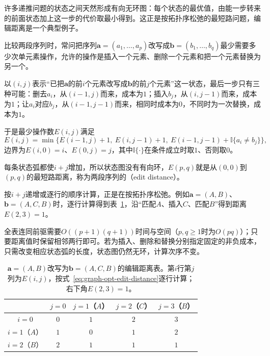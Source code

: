 许多递推问题的状态之间天然形成有向无环图：每个状态的最优值，由能一步转来的前面状态加上这一步的代价取最小得到。这正是按拓扑序松弛的最短路问题，编辑距离是一个典型例子。

比较两段序列时，常问把序列$\bm a=(a_1,\ldots,a_p)$改写成$\bm b=(b_1,\ldots,b_q)$最少需要多少次单元素操作，允许的操作是插入一个元素、删除一个元素和把一个元素替换为另一个。

以$(i,j)$表示“已把$\bm a$的前$i$个元素改写成$\bm b$的前$j$个元素”这一状态，最后一步只有三种可能：删去$a_i$，从$(i-1,j)$而来，成本为$1$；插入$b_j$，从$(i,j-1)$而来，成本为$1$；让$a_i$对应$b_j$，从$(i-1,j-1)$而来，相同时成本为$0$，不同时为一次替换，成本为$1$。

于是最少操作数$E(i,j)$满足
\begin{equation}
  E(i,j)=\min\bigl\{E(i-1,j)+1,\ E(i,j-1)+1,\ E(i-1,j-1)+\mathbb I\{a_i\neq b_j\}\bigr\},
  \label{eq:graph-opt-edit-distance}
\end{equation}
边界为$E(i,0)=i$、$E(0,j)=j$，其中$\mathbb I\{\cdot\}$在条件成立时取$1$、否则取$0$。

每条状态弧都使$i+j$增加，所以状态图没有有向环，$E(p,q)$就是从$(0,0)$到$(p,q)$的最短路距离，称为两段序列的（edit distance）。

按$i+j$递增或逐行的顺序计算，正是在按拓扑序松弛。例如$\bm a=(A,B)$、$\bm b=(A,C,B)$时，逐行计算得到表~\ref{tab:graph-opt-edit-distance}，沿“匹配$A$、插入$C$、匹配$B$”得到距离$E(2,3)=1$。

全表连同前驱需要$O((p+1)(q+1))$时间与空间（$p,q\geq1$时为$O(pq)$）；只要距离值时保留相邻两行即可。若为插入、删除和替换分别指定固定的非负成本，只需改变相应状态弧的长度，状态图仍然无环，计算次序不变。

\begin{table}[!htb]
  \centering
  \begin{tabular}{@{}ccccc@{}}
    \toprule
    & $j=0$ & $j=1$（$A$） & $j=2$（$C$） & $j=3$（$B$） \\
    \midrule
    $i=0$ & $0$ & $1$ & $2$ & $3$ \\
    $i=1$（$A$） & $1$ & $0$ & $1$ & $2$ \\
    $i=2$（$B$） & $2$ & $1$ & $1$ & $1$ \\
    \bottomrule
  \end{tabular}
  \caption{$\bm a=(A,B)$改写为$\bm b=(A,C,B)$的编辑距离表。第$i$行第$j$列为$E(i,j)$，按式~\eqref{eq:graph-opt-edit-distance}逐行计算；右下角$E(2,3)=1$。}
  \label{tab:graph-opt-edit-distance}
\end{table}

